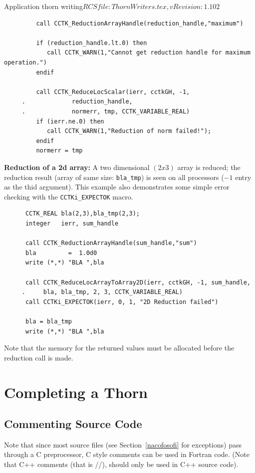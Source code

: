 \begin{cactuspart}{2}{Application thorn writing}{$RCSfile: ThornWriters.tex,v $}{$Revision: 1.102 $}
\begin{verbatim}
         call CCTK_ReductionArrayHandle(reduction_handle,"maximum")

         if (reduction_handle.lt.0) then
            call CCTK_WARN(1,"Cannot get reduction handle for maximum operation.")
         endif

         call CCTK_ReduceLocScalar(ierr, cctkGH, -1,
     .             reduction_handle,
     .             normerr, tmp, CCTK_VARIABLE_REAL)
         if (ierr.ne.0) then
            call CCTK_WARN(1,"Reduction of norm failed!");
         endif
         normerr = tmp
\end{verbatim}


{\bf Reduction of a 2d array:}  A two dimensional $(2x3)$ array is
reduced; the reduction result (array of same size: {\tt bla\_tmp}) is seen
on all processors ($-1$ entry as the thid argument).  This example also demonstrates
some simple error checking with the {\tt CCTKi\_EXPECTOK} macro.
\begin{verbatim}
      CCTK_REAL bla(2,3),bla_tmp(2,3);
      integer   ierr, sum_handle

      call CCTK_ReductionArrayHandle(sum_handle,"sum")
      bla         =  1.0d0
      write (*,*) "BLA ",bla

      call CCTK_ReduceLocArrayToArray2D(ierr, cctkGH, -1, sum_handle,
     .     bla, bla_tmp, 2, 3, CCTK_VARIABLE_REAL)
      call CCTKi_EXPECTOK(ierr, 0, 1, "2D Reduction failed")

      bla = bla_tmp
      write (*,*) "BLA ",bla
\end{verbatim}

Note that the memory for the returned values must be allocated before
the reduction call is made.



\chapter{Completing a Thorn}

\section{Commenting Source Code}

Note that since most source files (see Section~\ref{nacofosofi} for
exceptions) pass through a C preprocessor, C style comments can be
used in Fortran code. (Note that C++ comments (that is //),
should only be used in C++ source code).


\end{cactuspart}
